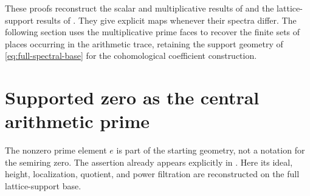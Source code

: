 \documentclass[11pt,a4paper]{article}
\theoremstyle{definition}\newtheorem{definition}[theorem]{Definition}
\begin{document}
These proofs reconstruct the scalar and multiplicative results of \cite{globalization,secondary} and the lattice-support results of \cite{support}. They give explicit maps whenever their spectra differ. The following section uses the multiplicative prime faces to recover the finite sets of places occurring in the arithmetic trace, retaining the support geometry of \eqref{eq:full-spectral-base} for the cohomological coefficient construction.



\section{Supported zero as the central arithmetic prime}
\label{sec:supported-prime}
The nonzero prime element $e$ is part of the starting geometry, not a notation for the semiring zero. The assertion already appears explicitly in \cite[\texttt{thm:zero-prime-not-irr}]{globalization}. Here its ideal, height, localization, quotient, and power filtration are reconstructed on the full lattice-support base.
\end{document}
